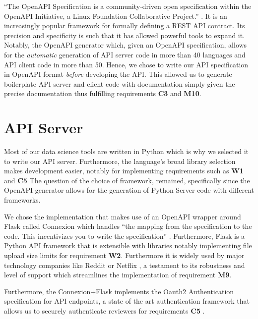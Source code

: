 \documentclass[\version]{l4proj}
\begin{document}
``The OpenAPI Specification is a community-driven open specification within the OpenAPI Initiative, a Linux Foundation Collaborative Project.'' \autocite{OAIOpenAPISpecification2020}.
It is an increasingly popular framework for formally defining a REST API contract.
Its precision and specificity is such that it has allowed powerful tools to expand it.
Notably, the OpenAPI generator \autocite{OpenAPIToolsOpenapigenerator2020} which, given an OpenAPI specification, allows for the \textit{automatic} generation of API server code in more than 40 languages and API client code in more than 50.
Hence, we chose to write our API specification in OpenAPI format \textit{before} developing the API.
This allowed us to generate boilerplate API server and client code with documentation simply given the precise documentation thus fulfilling requirements \textbf{C3} and \textbf{M10}.

\section{API Server}

Most of our data science tools are written in Python which is why we selected it to write our API server.
Furthermore, the language's broad library selection makes development easier, notably for implementing requirements such as \textbf{W1} and \textbf{C5}
The question of the choice of framework, remained, specifically since the OpenAPI generator allows for the generation of Python Server code with different frameworks.

We chose the implementation that makes use of an OpenAPI wrapper around Flask called Connexion which handles ``the mapping from the specification to the code.
This incentivizes you to write the specification'' \autocite{ZalandoConnexion2020}.
Furthermore, Flask is a Python API framework that is extensible with libraries notably implementing file upload size limits for requirement \textbf{W2}. Furthermore it is widely used by major technology companies like Reddit or Netflix \autocite{WhyDevelopersFlask}, a testament to its robustness and level of support which streamlines the implementation of requirement \textbf{M9}.

Furthermore, the Connexion+Flask implements the Oauth2 Authentication specification for API endpoints, a state of the art authentication framework that allows us to securely authenticate reviewers for requirements \textbf{C5} \autocite{jonesOAuthAuthorizationFramework2012}.
\end{document}
